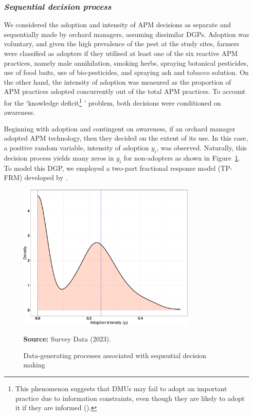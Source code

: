 \documentclass[fleqn,twoside,reqno]{article}
\begin{document}
\subsubsection{\textit{Sequential decision process}}
We considered the adoption and intensity of APM decisions as separate and sequentially made by orchard managers, assuming dissimilar DGPs. Adoption was voluntary, and given the high prevalence of the pest at the study sites, farmers were classified as adopters if they utilised at least one of the six reactive APM practices, namely male annihilation, smoking herbs, spraying botanical pesticides, use of food baits, use of bio-pesticides, and spraying ash and tobacco solution. On the other hand, the intensity of adoption was measured as the proportion of APM practices adopted concurrently out of the total APM practices. To account for the ‘knowledge deficit\footnote{This phenomenon suggests that DMUs may fail to adopt an important practice due to information constraints, even though they are likely to adopt it if they are informed (\cite{Khan2021}).} ’ problem, both decisions were conditioned on awareness.

Beginning with adoption and contingent on awareness, if an orchard manager adopted APM technology, then they decided on the extent of its use. In this case, a positive random variable, intensity of adoption $y_i$, was observed. Naturally, this decision process yields many zeros in $y_i$ for non-adopters as shown in Figure~\ref{fig:2}. To model this DGP, we employed a two-part fractional response model (TP-FRM) developed by \cite{Ramalho2009}.

\begin{figure}[!ht]
  \centering
  \includegraphics[width=0.8\textwidth]{density.pdf}
  \caption{Data-generating processes associated with sequential decision making}
  \label{fig:2}
  \smallskip
  \textbf{Source:} Survey Data (2023).
\end{figure} 
\end{document}
